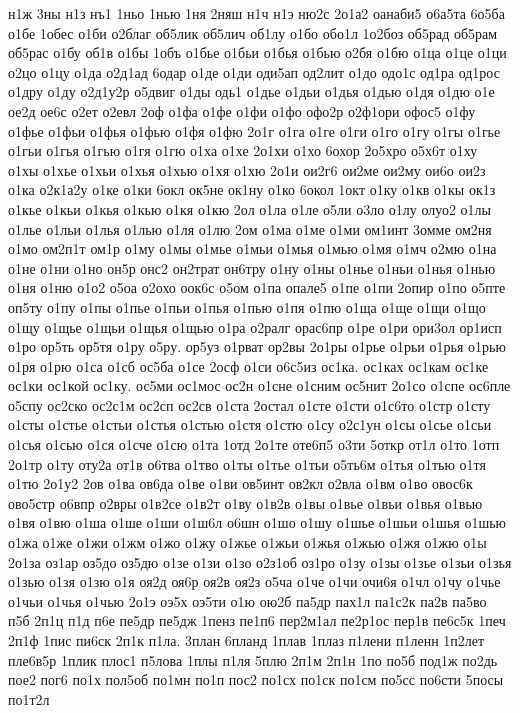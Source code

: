 {н1ж
3ны
н1з
нъ1
1ньо
1нью
1ня
2няш
н1ч
н1э
ню2с
2о1а2
оанаби5
о6а5та
6о5ба
о1бе
1обес
о1би
о2благ
об5лик
об5лич
об1лу
о1бо
обо1л
1о2боз
об5рад
об5рам
об5рас
о1бу
об1в
о1бы
1объ
о1бье
о1бьи
о1бья
о1бью
о2бя
о1бю
о1ца
о1це
о1ци
о2цо
о1цу
о1да
о2д1ад
6одар
о1де
о1ди
оди5ап
од2лит
о1до
одо1с
од1ра
од1рос
о1дру
о1ду
о2д1у2р
о5двиг
о1ды
одь1
о1дье
о1дьи
о1дья
о1дью
о1дя
о1дю
о1е
ое2д
ое6с
о2ет
о2евл
2оф
о1фа
о1фе
о1фи
о1фо
офо2р
о2ф1ори
офос5
о1фу
о1фье
о1фьи
о1фья
о1фью
о1фя
о1фю
2о1г
о1га
о1ге
о1ги
о1го
о1гу
о1гы
о1гье
о1гьи
о1гья
о1гью
о1гя
о1гю
о1ха
о1хе
2о1хи
о1хо
6охор
2о5хро
о5х6т
о1ху
о1хы
о1хье
о1хьи
о1хья
о1хью
о1хя
о1хю
2о1и
ои2г6
ои2ме
ои2му
ои6о
ои2з
о1ка
о2к1а2у
о1ке
о1ки
6окл
ок5не
ок1ну
о1ко
6окол
1окт
о1ку
о1кв
о1кы
ок1з
о1кье
о1кьи
о1кья
о1кью
о1кя
о1кю
2ол
о1ла
о1ле
о5ли
о3ло
о1лу
олуо2
о1лы
о1лье
о1льи
о1лья
о1лью
о1ля
о1лю
2ом
о1ма
о1ме
о1ми
ом1инт
3омме
ом2ня
о1мо
ом2п1т
ом1р
о1му
о1мы
о1мье
о1мьи
о1мья
о1мью
о1мя
о1мч
о2мю
о1на
о1не
о1ни
о1но
он5р
онс2
он2трат
он6тру
о1ну
о1ны
о1нье
о1ньи
о1нья
о1нью
о1ня
о1ню
о1о2
о5оа
о2охо
оок6с
о5ом
о1па
опале5
о1пе
о1пи
2опир
о1по
о5пте
оп5ту
о1пу
о1пы
о1пье
о1пьи
о1пья
о1пью
о1пя
о1пю
о1ща
о1ще
о1щи
о1що
о1щу
о1щье
о1щьи
о1щья
о1щью
о1ра
о2ралг
орас6пр
о1ре
о1ри
ори3ол
ор1исп
о1ро
ор5ть
ор5тя
о1ру
о5ру.
ор5уз
о1рват
ор2вы
2о1ры
о1рье
о1рьи
о1рья
о1рью
о1ря
о1рю
о1са
о1сб
ос5ба
о1се
2осф
о1си
о6с5из
ос1ка.
ос1ках
ос1кам
ос1ке
ос1ки
ос1кой
ос1ку.
ос5ми
ос1мос
ос2н
о1сне
о1сним
ос5нит
2о1со
о1спе
ос6пле
о5спу
ос2ско
ос2с1м
ос2сп
ос2св
о1ста
2остал
о1сте
о1сти
о1с6то
о1стр
о1сту
о1сты
о1стье
о1стьи
о1стья
о1стью
о1стя
о1стю
о1су
о2с1ун
о1сы
о1сье
о1сьи
о1сья
о1сью
о1ся
о1сче
о1сю
о1та
1отд
2о1те
оте6п5
о3ти
5откр
от1л
о1то
1отп
2о1тр
о1ту
оту2а
от1в
о6тва
о1тво
о1ты
о1тье
о1тьи
о5ть6м
о1тья
о1тью
о1тя
о1тю
2о1у2
2ов
о1ва
ов6да
о1ве
о1ви
ов5инт
ов2кл
о2вла
о1вм
о1во
овос6к
ово5стр
о6впр
о2вры
о1в2се
о1в2т
о1ву
о1в2в
о1вы
о1вье
о1вьи
о1вья
о1вью
о1вя
о1вю
о1ша
о1ше
о1ши
о1ш6л
о6шн
о1шо
о1шу
о1шье
о1шьи
о1шья
о1шью
о1жа
о1же
о1жи
о1жм
о1жо
о1жу
о1жье
о1жьи
о1жья
о1жью
о1жя
о1жю
о1ы
2о1за
оз1ар
оз5до
оз5дю
о1зе
о1зи
о1зо
о2з1об
оз1ро
о1зу
о1зы
о1зье
о1зьи
о1зья
о1зью
о1зя
о1зю
о1я
оя2д
оя6р
оя2в
оя2з
о5ча
о1че
о1чи
очи6я
о1чл
о1чу
о1чье
о1чьи
о1чья
о1чью
2о1э
оэ5х
оэ5ти
о1ю
ою2б
па5др
пах1л
па1с2к
па2в
па5во
п5б
2п1ц
п1д
п6е
пе5др
пе5дж
1пенз
пе1п6
пер2м1ал
пе2р1ос
пер1в
пе6с5к
1печ
2п1ф
1пис
пи6ск
2п1к
п1ла.
3план
6планд
1плав
1плаз
п1лени
п1ленн
1п2лет
пле6в5р
1плик
плос1
п5лова
1плы
п1ля
5плю
2п1м
2п1н
1по
по5б
под1ж
по2дь
пое2
пог6
по1х
пол5об
по1мн
по1п
пос2
по1сх
по1ск
по1см
по5сс
по6сти
5посы
по1т2л
}
